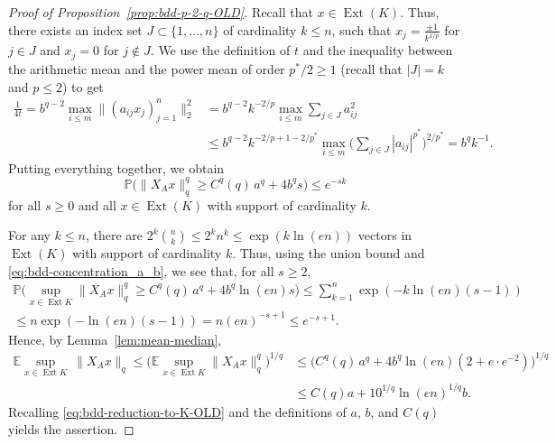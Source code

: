 \documentclass[a4paper]{amsart}
\theoremstyle{definition}
\theoremstyle{remark}
\numberwithin{equation}{section}
\newcommand*{\EE}{\mathbb{E}}
\newcommand*{\PP}{\mathbb{P}}
\newcommand*{\Ext}{\operatorname{Ext}} %
\begin{document}
\begin{proof}[Proof of Proposition~\ref{prop:bdd-p-2-q-OLD}]
	Recall that $x\in \Ext(K)$.
	Thus, there exists  an index set $J\subset \{1,\dots,n\}$ of cardinality $k\leq n$, such that $x_j = \frac{\pm 1}{k^{1/p}}$ for $j\in J$ and $x_j=0$ for $j\notin J$.
	We use the definition of $t$ and the inequality between the arithmetic mean and the power mean of order $p^*/2\geq 1$ (recall that $|J|=k$ and $p\leq 2$) to get
	\begin{align*}
	\frac{1}{4 t} = b^{q-2} \max_{i\leq m} \| (a_{ij}x_j)_{j=1}^n\|_{2}^2
	& = b^{q-2} k^{-2/p} \max_{i\leq m} \sum_{j\in J} a_{ij}^2\\
	&\leq  b^{q-2} k^{-2/p + 1 - 2/p^*} \max_{i\leq m} \bigl(\sum_{j\in J} |a_{ij}|^{p^*}\bigr)^{2/p^*} = b^q k^{-1}.
	\end{align*}
	Putting everything together, we obtain
	\begin{equation}
	\label{eq:bdd-concentration_a_b}
	\PP\bigl(\|X_{A} x\|_q^q \geq C^q(q)\,  a^q + 4 b^q s \bigr)
	\leq e^{-sk}
	\end{equation}
	for all $s\geq 0$ and all $x\in \Ext(K)$ with support of cardinality $k$.
	
	For any $k\leq n$,
	there are $2^k \binom{n}{k} \leq 2^k n^k \leq \exp( k \ln(en))$ vectors in $\Ext(K)$
	with support of cardinality $k$.
	Thus, using the union bound and \eqref{eq:bdd-concentration_a_b}, we see that, for all $s\geq 2$,
	\begin{multline*}
	\PP\bigl(\sup_{x\in \Ext K}\!\|X_A x\|_q^q \geq C^q(q)\,  a^q + 4 b^q \ln(en) s \bigr)
	\leq \sum_{k=1}^n \exp( -k \ln(en)(s-1))\\
	\leq n \exp( - \ln(en)(s-1))
	= n(en)^{-s+1}\leq e^{-s+1}.
	\end{multline*}
	Hence, by Lemma~\ref{lem:mean-median},
	\begin{align*}
	\EE \!\! \sup_{x\in \Ext K}\!\!\ \|X_{A} x\|_q
	\leq \bigl(\EE\!\! \sup_{x\in \Ext K}\!\! \|X_{A} x\|_q^q\bigr)^{1/q}
	&\leq  \bigl( C^q(q)\,  a^q + 4 b^q \ln(en) (2 + e\cdot e^{-2}) \bigr)^{1/q}\\
	&\leq C(q)  a + 10^{1/q}\ln(en)^{1/q}b.
	\end{align*}
	Recalling \eqref{eq:bdd-reduction-to-K-OLD} and the definitions of $a$, $b$, and $C(q)$ yields the assertion.
\end{proof}
\end{document}
